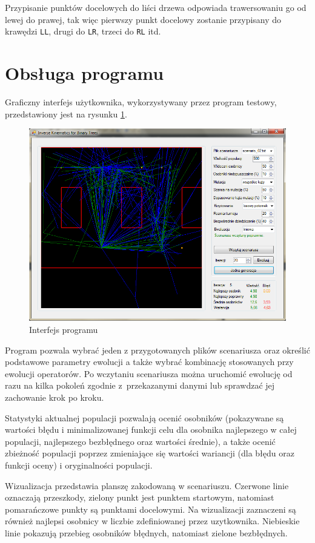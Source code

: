 \documentclass[11pt, leqno]{article}
\begin{document}
Przypisanie punktów docelowych do liści drzewa odpowiada trawersowaniu go od lewej do prawej, tak więc pierwszy punkt docelowy zostanie przypisany do krawędzi \texttt{LL}, drugi do \texttt{LR}, trzeci do \texttt{RL} itd.

\section{Obsługa programu}
Graficzny interfejs użytkownika, wykorzystywany przez program testowy, przedstawiony jest na rysunku \ref{fig:gui}.
\begin{figure}[h!]
	\centering
	\includegraphics[scale=0.5]{gui}
	\caption{Interfejs programu}
	\label{fig:gui}
\end{figure}

Program pozwala wybrać jeden z przygotowanych plików scenariusza oraz określić podstawowe parametry ewolucji a także wybrać kombinację stosowanych przy ewolucji operatorów. Po wczytaniu scenariusza można uruchomić ewolucję od razu na kilka pokoleń zgodnie z~przekazanymi danymi lub sprawdzać jej zachowanie krok po kroku.

Statystyki aktualnej populacji pozwalają ocenić osobników (pokazywane są wartości błędu i minimalizowanej funkcji celu dla osobnika najlepszego w całej populacji, najlepszego bezbłędnego oraz wartości średnie), a także ocenić zbieżność populacji poprzez zmieniające się wartości wariancji (dla błędu oraz funkcji oceny) i oryginalności populacji. 

Wizualizacja przedstawia planszę zakodowaną w scenariuszu. Czerwone linie oznaczają przeszkody, zielony punkt jest punktem startowym, natomiast pomarańczowe punkty są punktami docelowymi. Na wizualizacji zaznaczeni są również najlepsi osobnicy w liczbie zdefiniowanej przez uzytkownika. Niebieskie linie pokazują przebieg osobników błędnych, natomiast zielone bezbłędnych.
\end{document}
